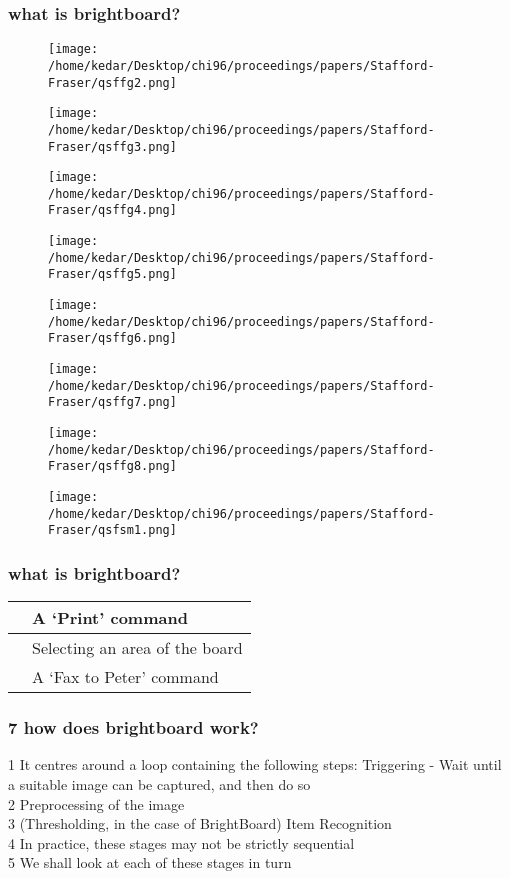 \documentclass{beamer}
\begin{document}
\begin{frame}
\frametitle{what is brightboard?}
\begin{figure}\texttt{[image: /home/kedar/Desktop/chi96/proceedings/papers/Stafford-Fraser/qsffg2.png]}\end{figure}\begin{figure}\texttt{[image: /home/kedar/Desktop/chi96/proceedings/papers/Stafford-Fraser/qsffg3.png]}\end{figure}\begin{figure}\texttt{[image: /home/kedar/Desktop/chi96/proceedings/papers/Stafford-Fraser/qsffg4.png]}\end{figure}\begin{figure}\texttt{[image: /home/kedar/Desktop/chi96/proceedings/papers/Stafford-Fraser/qsffg5.png]}\end{figure}\begin{figure}\texttt{[image: /home/kedar/Desktop/chi96/proceedings/papers/Stafford-Fraser/qsffg6.png]}\end{figure}\begin{figure}\texttt{[image: /home/kedar/Desktop/chi96/proceedings/papers/Stafford-Fraser/qsffg7.png]}\end{figure}\begin{figure}\texttt{[image: /home/kedar/Desktop/chi96/proceedings/papers/Stafford-Fraser/qsffg8.png]}\end{figure}\begin{figure}\texttt{[image: /home/kedar/Desktop/chi96/proceedings/papers/Stafford-Fraser/qsfsm1.png]}\end{figure}\end{frame}
\begin{frame}
\frametitle{what is brightboard?}
\begin{table}\begin{tabular}{|l|l|}\toprule\textbf{}&\textbf{A `Print' command}\\\midrule
&Selecting an area of the board \\& A `Fax to Peter' command \\\bottomrule\end{tabular}\end{table}
\end{frame}
\begin{frame}
\frametitle{7 how does brightboard work?}
1  It centres around a loop containing the following steps:              Triggering - Wait until a suitable image can be captured, and then do so \\2        Preprocessing of the image \\3  (Thresholding, in the case of BrightBoard)       Item Recognition \\4           In practice, these stages may not be strictly sequential \\5      We shall look at each of these stages in turn \\
\end{frame}
\end{document}
